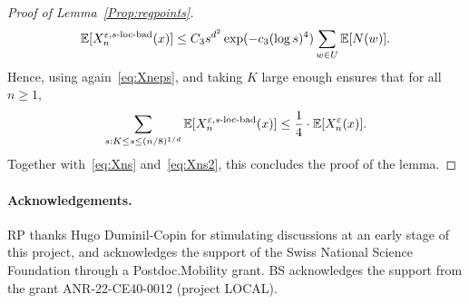 \documentclass[11pt,a4paper]{article}
\numberwithin{equation}{section}
\theoremstyle{plain}
\theoremstyle{definition}
\begin{document}
\begin{proof}[Proof of Lemma~\textup{\ref{Prop:regpoints}}]
\begin{equation}  
\mathbb E[X_n^{\varepsilon, s\textup{-loc-bad}}(x)] \le C_3 s^{d^2}\exp(-c_3(\log s)^4) \sum_{w\in U}  \mathbb E[N(w)].
\end{equation}
Hence, using again~\eqref{eq:Xneps}, and taking $K$ large enough ensures that for all $n\ge 1$,
\begin{equation}
\sum_{s:K\le s \le (n/8)^{1/d}}\mathbb E[X_n^{\varepsilon, s\textup{-loc-bad}}(x)] \le \frac 14 \cdot \mathbb E[X_n^\varepsilon(x)].
\end{equation}
Together with~\eqref{eq:Xns} and~\eqref{eq:Xns2}, this concludes the proof of the lemma. 
\end{proof} 

\paragraph{Acknowledgements.} RP thanks Hugo Duminil-Copin for stimulating discussions at an early stage of this project, and acknowledges the support of the Swiss National Science Foundation through a Postdoc.Mobility grant. BS acknowledges the support from the grant ANR-22-CE40-0012 (project LOCAL).




\end{document}
